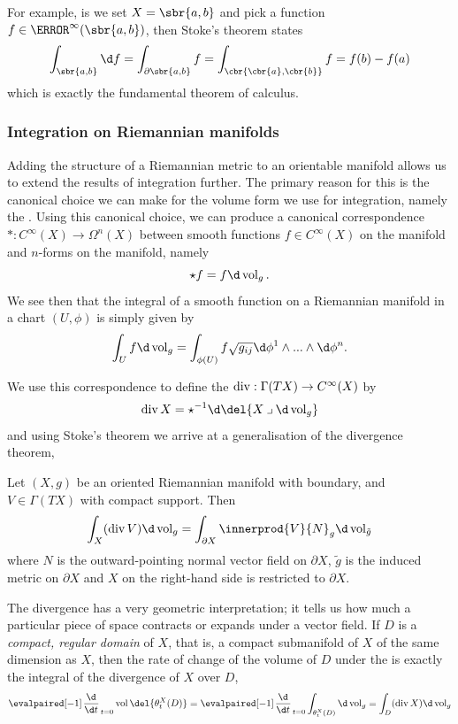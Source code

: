 For example, is we set \(X = \sbr{a,b}\) and pick a function \(f \in \C^\infty(\sbr{a, b})\), then Stoke's theorem states 
\[
	\int_{\sbr{a, b}} \d f = \int_{\partial \sbr{a, b}} f =  \int_{\cbr{\cbr{a}, \cbr{b}}} f = f(b) - f(a)
\]
which is exactly the fundamental theorem of calculus.



\subsubsection{Integration on Riemannian manifolds}

Adding the structure of a Riemannian metric to an orientable manifold allows us to extend the results of integration further.
The primary reason for this is the canonical choice we can make for the volume form we use for integration, namely the .
Using this canonical choice, we can produce a canonical correspondence \(*: C^\infty(X) \to \Omega^n(X)\) between smooth functions \(f\in C^\infty(X)\) on the manifold and \(n\)-forms on the manifold, namely
\[
	\star f = f \d\vol_g	
.\]
We see then that the integral of a smooth function on a Riemannian manifold in a chart \((U, \phi)\) is simply given by
\[
	\int_U f \d\vol_g = \int_{\phi(U)} f \sqrt{g_{ij}} \d\phi^1 \wedge ... \wedge \d\phi^n.
\]

We use this correspondence to define the  \(\operatorname{div}: \Gamma(TX) \to C^\infty(X)\) by
\[
	\dive X = \star^{-1} \d \del{X\iprod \d\vol_g}
\]
and using Stoke's theorem we arrive at a generalisation of the divergence theorem,
\begin{theorem}
	\label{thm:divergence}
	Let \((X, g)\) be an oriented Riemannian manifold with boundary, and \(V\in\Gamma(TX)\) with compact support.
	Then
	\[
		\int_X (\dive V) \d\vol_g = \int_{\partial X} \innerprod{V}{N}_g \d\vol_{\tilde g}
	\]
	where \(N\) is the outward-pointing normal vector field on \(\partial X\), \(\tilde g\) is the induced metric on \(\partial X\) and \(X\) on the right-hand side is restricted to \(\partial X\).
\end{theorem}
The divergence has a very geometric interpretation; it tells us how much a particular piece of space contracts or expands under a vector field.
If \(D\) is a \emph{compact, regular domain} of \(X\), that is, a compact submanifold of \(X\) of the same dimension as \(X\), then the rate of change of the volume of \(D\) under the  is exactly the integral of the divergence of \(X\) over \(D\),
\[
	\eval{\od{}{t}}_{t=0} \vol\del{\theta_t^X(D)} = \eval{\od{}{t}}_{t=0} \int_{\theta_t^X(D)} \d\vol_g = \int_D (\dive X) \d\vol_g
\]


